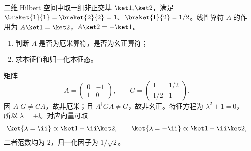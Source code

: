 
\begin{question}
二维 Hilbert 空间中取一组非正交基 $\ket1,\ket2$，满足 $\braket{1}{1}=\braket{2}{2}=1$、$\braket{1}{2}=1/2$。线性算符 $A$ 的作用为 $A\ket1=\ket2$，$A\ket2=-\ket1$。
\begin{enumerate}
  \item 判断 $A$ 是否为厄米算符，是否为幺正算符；
  \item 求本征值和归一化本征态。
\end{enumerate}
\begin{solution}
矩阵
\[
  A=\begin{pmatrix}0&-1\\1&0\end{pmatrix},
  \qquad G=\begin{pmatrix}1&1/2\\1/2&1\end{pmatrix}.
\]
因 $A^\dagger G\ne GA$，故非厄米；且 $A^\dagger GA\ne G$，故非幺正。特征方程为 $\lambda^2+1=0$，所以 $\lambda=\pm\ii$。对应向量可取
\[
  \ket{\lambda=\ii}\propto \ket1-\ii\ket2,
  \qquad
  \ket{\lambda=-\ii}\propto \ket1+\ii\ket2,
\]
二者范数均为 $2$，归一化因子为 $1/\sqrt2$。
\end{solution}
\end{question}


